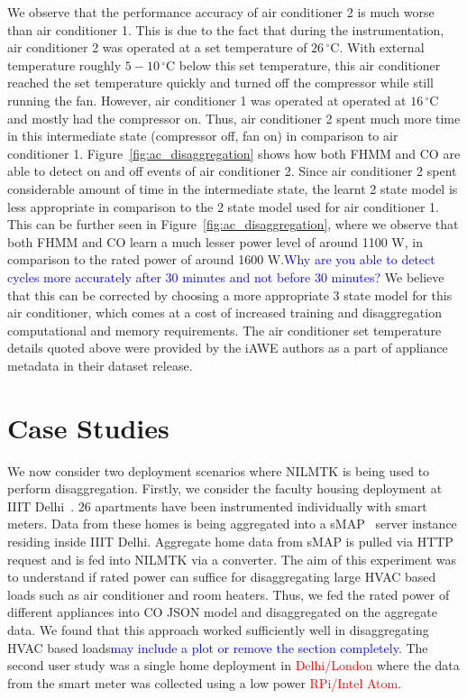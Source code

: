 \documentclass{sig-alternate}
\newcommand{\redcolor}[1]{\textcolor{red}{#1}}
\newcommand{\bluecolor}[1]{\textcolor{blue}{#1}}
\newcommand{\figref}[1]{Figure~\ref{#1}}
\begin{document}
We observe that the performance accuracy of air conditioner 2 is much worse than air conditioner 1. This is due to the fact that during the instrumentation, air conditioner 2 was operated at a set temperature of $26\,^{\circ}\mathrm{C}$. With external temperature roughly $5-10\,^{\circ}\mathrm{C}$ below this set temperature, this air conditioner reached the set temperature quickly and turned off the compressor while still running the fan. However, air conditioner 1 was operated at operated at $16\,^{\circ}\mathrm{C}$ and mostly had the compressor on. Thus, air conditioner 2 spent much more time in this intermediate state (compressor off, fan on) in comparison to air conditioner 1. \figref{fig:ac_disaggregation} shows how both FHMM and CO are able to detect on and off events of air conditioner 2. Since air conditioner 2 spent considerable amount of time in the intermediate state, the learnt 2 state model is less appropriate in comparison to the 2 state model used for air conditioner 1. This can be further seen in \figref{fig:ac_disaggregation}, where we observe that both FHMM and CO learn a much lesser power level of around 1100 W, in comparison to the rated power of around 1600 W.\bluecolor{Why are you able to detect cycles more accurately after 30 minutes and not before 30 minutes?} We believe that this can be corrected by choosing a more appropriate 3 state model for this air conditioner, which comes at a cost of increased training and disaggregation computational and memory requirements. The air conditioner set temperature details quoted above were provided by the iAWE authors as a part of appliance metadata in their dataset release.




\section{Case Studies}
\label{sec:use_case}
We now consider two deployment scenarios where NILMTK is being used to perform disaggregation. Firstly, we consider the faculty housing deployment at IIIT Delhi~\cite{batra_2012}. 26 apartments have been instrumented individually with smart meters. Data from these homes is being aggregated into a sMAP~\cite{smap} server instance residing inside IIIT Delhi. Aggregate home data from sMAP is pulled via HTTP request and is fed into NILMTK via a converter. The aim of this experiment was to understand if rated power can suffice for disaggregating large HVAC based loads such as air conditioner and room heaters. Thus, we fed the rated power of different appliances into CO JSON model and disaggregated on the aggregate data. We found that this approach worked sufficiently well in disaggregating HVAC based loads\bluecolor{may include a plot or remove the section completely}. The second user study was a single home deployment in \redcolor{Delhi/London} where the data from the smart meter was collected using a low power \redcolor{RPi/Intel Atom}.
\end{document}
